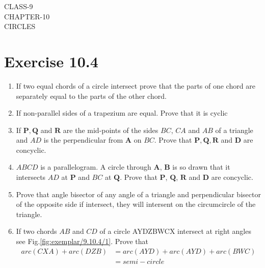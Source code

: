 \documentclass[12pt]{article}
\providecommand{\brak}[1]{\ensuremath{\left(#1\right)}}
\let\vec\mathbf
\begin{document}
\begin{center}
\textbf\large{CLASS-9\\CHAPTER-10 \\ CIRCLES}
\end{center}
\section*{Exercise 10.4}
\fi
\begin{enumerate}
\item If two equal chords of a circle intersect prove that the parts of one chord are separately equal to the parts of the other chord.
\item If non-parallel sides of a trapezium are equal. Prove that it is cyclic
\item If $\vec{P},\vec{Q}$ and $\vec{R}$ are the mid-points of the sides $BC$, $CA$ and $AB$ of a triangle and $AD$ is the perpendicular from $\vec{A}$ on $BC$. Prove that $\vec{P},\vec{Q},\vec{R}$ and $\vec{D}$ are concyclic.
\item $ABCD$ is a parallelogram. A circle through $\vec{A}$, $\vec{B}$ is so drawn that it intersects $AD$ at $\vec{P}$ and $BC$ at $\vec{Q}$. Prove that $\vec{P}$, $\vec{Q}$, $\vec{R}$ and $\vec{D}$ are concyclic.
\item Prove that angle bisector of any angle of a triangle and perpendicular bisector of the opposite side if intersect, they will intersent on the circumcircle of the triangle.
\item If two chords $AB$ and $CD$ of a circle AYDZBWCX intersect at right angles see Fig.\ref{fig:exemplar/9.10.4/1}. Prove that
	\begin{align}
		arc\brak{CXA}+arc\brak{DZB}&=arc\brak{AYD}+arc\brak{AYD}+arc\brak{BWC}\\&=semi-circle
	\end{align}

\end{enumerate}
\end{document}

